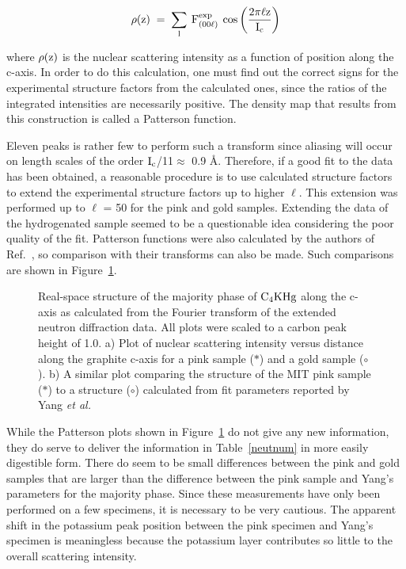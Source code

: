 \begin{equation}
\label{denscalc}
\rm \rho(z) \; = \; \sum_l \: F^{exp}_{(00\ell)} \: \cos \left( \frac{2\pi
\ell z}{I_c} \right)
\end{equation}

\noindent where $\rm \rho(z)$ is the nuclear scattering intensity as a
function  of position along the   c-axis.\cite{yang84} In order to  do this
calculation,  one must  find out  the  correct  signs  for the experimental
structure factors  from the  calculated  ones,  since    the ratios of  the
integrated  intensities are necessarily  positive.    The  density map that
results     from  this    construction     is     called  a       Patterson
function.\cite{speck88z}

        Eleven peaks  is rather  few  to  perform  such a  transform  since
aliasing will occur on length scales of the order $\rm I_c$/11$\approx$ 0.9
\AA.  Therefore, if a good fit to the data has  been obtained, a reasonable
procedure is to use calculated structure factors to extend the experimental
structure factors up to higher $\ell$.  This extension was  performed up to
$\ell$ = 50  for  the pink and gold  samples.   Extending  the data of  the
hydrogenated sample seemed  to be a questionable idea  considering the poor
quality  of the  fit.   Patterson functions  were  also  calculated by  the
authors of Ref.~\cite{yang84}, so comparison with their transforms can also
be made.  Such comparisons are shown in Figure~\ref{rhofig}.

\begin{figure}
\vspace{19cm}
\caption[Real-space structure of  $\rm C_4KHg$ along the
c-axis.]{Real-space structure of the majority  phase of $\rm  C_4KHg$ along
the c-axis as calculated from the Fourier transform of the extended neutron
diffraction data.  All plots were  scaled to a  carbon peak height  of 1.0.
a) Plot of nuclear scattering  intensity versus distance along the graphite
c-axis  for  a pink sample ($\ast$)  and  a gold   sample  ($\circ$).  b) A
similar plot comparing the structure  of the  MIT pink sample ($\ast$) to a
structure ($\circ$) calculated from fit parameters reported by Yang {\em et
al.\/}\cite{yang84}}
\label{rhofig}
\end{figure}


        While the Patterson plots shown in  Figure~\ref{rhofig} do not give
any  new information, they   do  serve   to  deliver   the information   in
Table~\ref{neutnum} in more easily  digestible form.  There do  seem  to be
small differences between  the pink and gold  samples that  are larger than
the  difference between  the  pink sample and   Yang's  parameters for  the
majority phase. Since these measurements have  only been performed on a
few specimens, it is necessary to be very cautious.   The apparent shift in
the potassium peak position between  the pink specimen  and Yang's specimen
is  meaningless because the  potassium layer contributes  so  little to the
overall scattering intensity.


